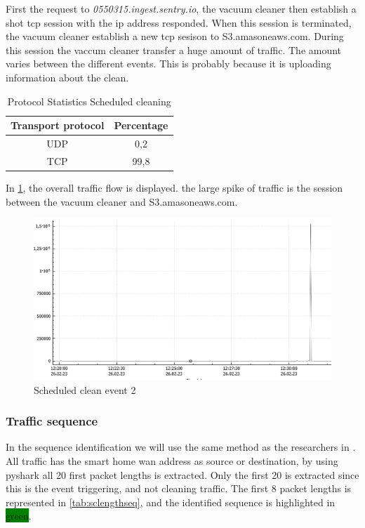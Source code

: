 First the request to \textit{0550315.ingest.sentry.io}, the vacuum cleaner then establish a shot tcp session with the ip address responded. When this session is terminated, the vacuum cleaner establish a new tcp sesison to S3.amasoneaws.com. During this session the vaccum cleaner transfer a huge amount of traffic. The amount varies between the different events. This is probably because it is uploading information about the clean.   
\begin{table}[H]
\centering
\caption{Protocol Statistics Scheduled cleaning}
\label{tab:scanalysisdist}
\begin{tabular}{|c|c|}
\hline
\textbf{Transport protocol} & \textbf{Percentage} \\ \hline
UDP                         & 0,2                 \\ \hline
TCP                         & 99,8                \\ \hline
\end{tabular}
\end{table}

In \ref{fig:Sc-graph}, the overall traffic flow is displayed. the large spike of traffic is the session between the vacuum cleaner and S3.amasoneaws.com.
\begin{figure}[H]
    \centering
    \includegraphics[width=\textwidth]{figures/SC-graph.png}
    \caption{Scheduled clean event 2}
    \label{fig:Sc-graph}
\end{figure}

\subsubsection{Traffic sequence}
In the sequence identification we will use the same method as the researchers in \cite{pingpong}. All traffic has the smart home wan address as source or destination, by using pyshark all 20 first packet lengths is extracted. Only the first 20 is extracted since this is the event triggering, and not cleaning traffic. The first 8 packet lengths is represented in \ref{tab:sclengthseq}, and the identified sequence is highlighted in \colorbox{green}{green}.


